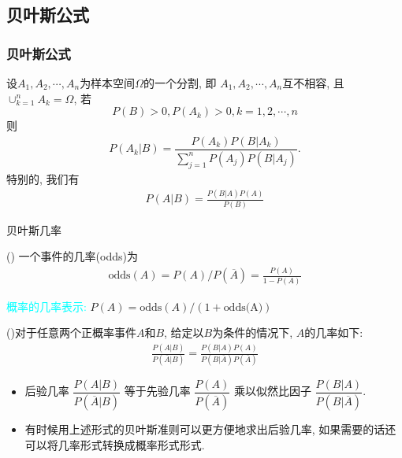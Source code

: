 \documentclass[Prob-All.tex]{subfiles}
\begin{document}
\subsection{贝叶斯公式}
\begin{frame}
	\frametitle{贝叶斯公式}
	\begin{thm}
		设$A_1,A_2,\cdots,A_n$为样本空间$\Omega$的一个分割, 即 $A_1,A_2,\cdots,A_n$互不相容, 且$\cup_{k=1}^nA_k=\Omega$, 若 $$P(B)>0, P(A_k)>0, k=1,2,\cdots,n$$ 则
		\begin{eqnarray*}
			P(A_k|B)=\dfrac{P(A_k)P(B|A_k)}{\sum_{j=1}^nP(A_j)P(B|A_j)}.
		\end{eqnarray*}
	特别的, 我们有
  \begin{eqnarray*}
    P(A|B)=\frac{P(B|A)P(A)}{P(B)}
    \end{eqnarray*}
	\end{thm}
\end{frame}


\begin{frame}{贝叶斯几率}
    \begin{defi}() 一个事件的几率(odds)为
    \begin{eqnarray*}
     ​\text{odds}(A)=P(A)/P(\overline{A})=\frac{P(A)}{1-P(A)}
     \end{eqnarray*}
    \end{defi}
  \pause
  \textcolor{cyan}{概率的几率表示:} $P(A)=\text{odds}(A)/(1+\text{odds(A)}) $
  \begin{thm} ()对于任意两个正概率事件$A$和$B$, 给定以$B$为条件的情况下, $A$的几率如下:
   \begin{eqnarray*}
    \frac{P(A|B)}{P(\overline{A}| B)}=\frac{P(B| A)P(A)}{P(B| \overline{A})P(\overline{A})}
    \end{eqnarray*}
    \end{thm}
  \pause

  \begin{itemize}[<+-|alert@+>]
  \item 后验几率 $\dfrac{P(A|B)}{P(\overline{A}|B)}$ 等于先验几率 $\dfrac{P(A)}{P(\overline{A})}$ 乘以似然比因子 $\dfrac{P(B|A)}{P(B|\overline{A})}$. %
  \item 有时候用上述形式的贝叶斯准则可以更方便地求出后验几率, 如果需要的话还可以将几率形式转换成概率形式形式.
  \end{itemize}


\end{frame}
\end{document}
